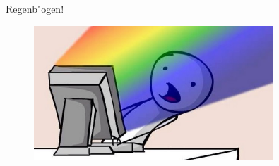 \documentclass[18pt]{beamer}
\begin{document}
\begin{frame}[fragile]{Regenb"ogen!}
\begin{figure}
\includegraphics[width=0.8\textwidth]{Rainbow} 
\end{figure}
\end{frame}
\end{document}

